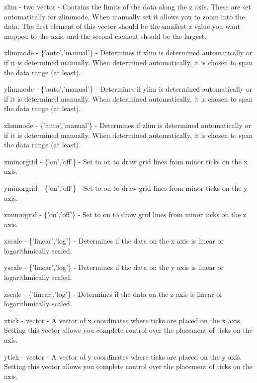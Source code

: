 \begin{DoxyItemize}
\item {\ttfamily zlim} -\/ {\ttfamily two vector} -\/ Contains the limits of the data along the z axis. These are set automatically for {\ttfamily zlimmode}. When manually set it allows you to zoom into the data. The first element of this vector should be the smallest z value you want mapped to the axis, and the second element should be the largest.  
\item {\ttfamily xlimmode} -\/ {\ttfamily \{'auto','manual'\}} -\/ Determines if {\ttfamily xlim} is determined automatically or if it is determined manually. When determined automatically, it is chosen to span the data range (at least).  
\item {\ttfamily ylimmode} -\/ {\ttfamily \{'auto','manual'\}} -\/ Determines if {\ttfamily ylim} is determined automatically or if it is determined manually. When determined automatically, it is chosen to span the data range (at least).  
\item {\ttfamily zlimmode} -\/ {\ttfamily \{'auto','manual'\}} -\/ Determines if {\ttfamily zlim} is determined automatically or if it is determined manually. When determined automatically, it is chosen to span the data range (at least).  
\item {\ttfamily xminorgrid} -\/ {\ttfamily \{'on','off'\}} -\/ Set to {\ttfamily on} to draw grid lines from minor ticks on the x axis.  
\item {\ttfamily yminorgrid} -\/ {\ttfamily \{'on','off'\}} -\/ Set to {\ttfamily on} to draw grid lines from minor ticks on the y axis.  
\item {\ttfamily zminorgrid} -\/ {\ttfamily \{'on','off'\}} -\/ Set to {\ttfamily on} to draw grid lines from minor ticks on the z axis.  
\item {\ttfamily xscale} -\/ {\ttfamily \{'linear','log'\}} -\/ Determines if the data on the x axis is linear or logarithmically scaled.  
\item {\ttfamily yscale} -\/ {\ttfamily \{'linear','log'\}} -\/ Determines if the data on the y axis is linear or logarithmically scaled.  
\item {\ttfamily zscale} -\/ {\ttfamily \{'linear','log'\}} -\/ Determines if the data on the z axis is linear or logarithmically scaled.  
\item {\ttfamily xtick} -\/ {\ttfamily vector} -\/ A vector of x coordinates where ticks are placed on the x axis. Setting this vector allows you complete control over the placement of ticks on the axis.  
\item {\ttfamily ytick} -\/ {\ttfamily vector} -\/ A vector of y coordinates where ticks are placed on the y axis. Setting this vector allows you complete control over the placement of ticks on the axis.  

\end{DoxyItemize}
